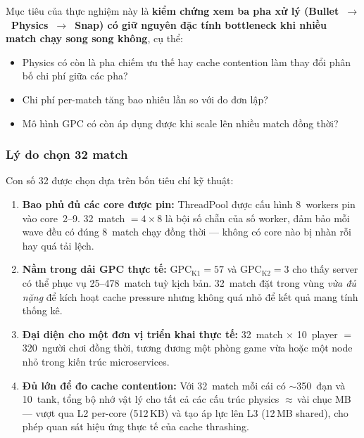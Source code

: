 \documentclass[12pt,a4paper]{report}
\begin{document}
Mục tiêu của thực nghiệm này là \textbf{kiểm chứng xem ba pha xử lý
(Bullet~$\to$~Physics~$\to$~Snap) có giữ nguyên đặc tính bottleneck khi
nhiều match chạy song song không}, cụ thể:

\begin{itemize}
  \item Physics có còn là pha chiếm ưu thế hay cache contention làm thay đổi
        phân bố chi phí giữa các pha?
  \item Chi phí per-match tăng bao nhiêu lần so với đo đơn lập?
  \item Mô hình GPC có còn áp dụng được khi scale lên nhiều match đồng thời?
\end{itemize}

\subsubsection*{Lý do chọn 32 match}

Con số 32 được chọn dựa trên bốn tiêu chí kỹ thuật:

\begin{enumerate}
  \item \textbf{Bao phủ đủ các core được pin:} ThreadPool được cấu hình
        8~workers pin vào core~2--9. 32~match $= 4 \times 8$ là bội số chẵn
        của số worker, đảm bảo mỗi wave đều có đúng 8~match chạy đồng thời ---
        không có core nào bị nhàn rỗi hay quá tải lệch.

  \item \textbf{Nằm trong dải GPC thực tế:} $\text{GPC}_{\text{K1}}=57$
        và $\text{GPC}_{\text{K2}}=3$ cho thấy server có thể phục vụ 25--478~match
        tuỳ kịch bản. 32~match đặt trong vùng \emph{vừa đủ nặng} để kích hoạt
        cache pressure nhưng không quá nhỏ để kết quả mang tính thống kê.

  \item \textbf{Đại diện cho một đơn vị triển khai thực tế:}
        32~match $\times$ 10~player $=$ 320~người chơi đồng thời, tương đương
        một phòng game vừa hoặc một node nhỏ trong kiến trúc microservices.

  \item \textbf{Đủ lớn để đo cache contention:} Với 32~match mỗi cái có
        $\sim$350~đạn và 10~tank, tổng bộ nhớ vật lý cho tất cả các cấu
        trúc physics $\approx$\,vài chục MB --- vượt qua L2 per-core (512\,KB)
        và tạo áp lực lên L3 (12\,MB shared), cho phép quan sát hiệu ứng
        thực tế của cache thrashing.
\end{enumerate}
\end{document}

